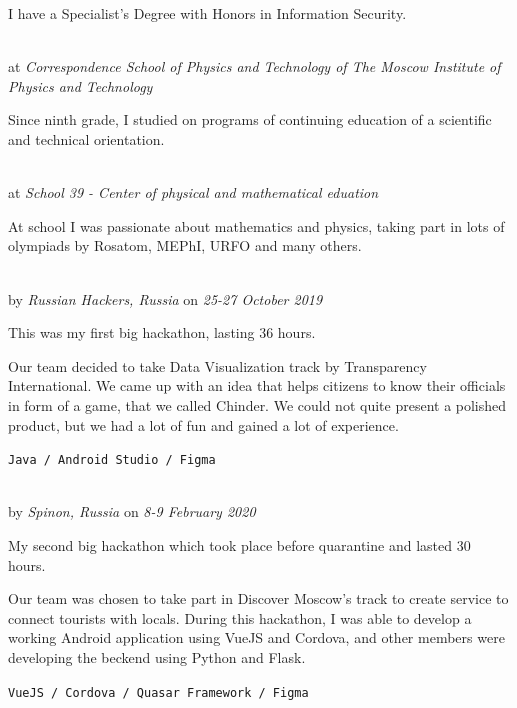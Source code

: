 I have a Specialist's Degree with Honors in Information Security.

\SmallSep

 \\
at \textit{Correspondence School of Physics and Technology of The Moscow Institute of Physics and Technology}
\SmallSep

Since ninth grade, I studied on programs of continuing education of a scientific and technical orientation.

\SmallSep

 \\
at \textit{School 39 - Center of physical and mathematical eduation}
\SmallSep

At school I was passionate about mathematics and physics, taking part in lots of olympiads by Rosatom, MEPhI, URFO and many others.

\Sep


 \\
by \textit{Russian Hackers, Russia}
on \textit{25-27 October 2019}
\SmallSep

This was my first big hackathon, lasting 36 hours.

Our team decided to take Data Visualization track by Transparency
International. We came up with an idea that helps citizens to know their
officials in form of a game, that we called Chinder. We could not quite present
a polished product, but we had a lot of fun and gained a lot of experience.

\texttt{Java / Android Studio / Figma}

\SmallSep

 \\
by \textit{Spinon, Russia}
on \textit{8-9 February 2020}
\SmallSep

My second big hackathon which took place before quarantine and lasted 30 hours.

Our team was chosen to take part in Discover Moscow's track to create service
to connect tourists with locals. During this hackathon, I was able to develop a
working Android application using VueJS and Cordova, and other members were
developing the beckend using Python and Flask.

\texttt{VueJS / Cordova / Quasar Framework / Figma}
